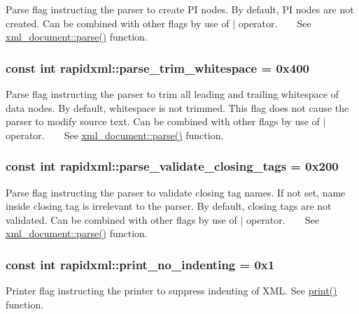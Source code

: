 Parse flag instructing the parser to create P\+I nodes. By default, P\+I nodes are not created. Can be combined with other flags by use of $\vert$ operator. ~\newline
~\newline
 See \hyperlink{singletonrapidxml_1_1xml__document_ac6e73ff9ac323bf5a370c38feb03a6b1}{xml\+\_\+document\+::parse()} function. \hypertarget{namespacerapidxml_a61912424b47db5038e726d4e1c22417f}{
\subsubsection[{parse\+\_\+trim\+\_\+whitespace}]{\setlength{\rightskip}{0pt plus 5cm}const int rapidxml\+::parse\+\_\+trim\+\_\+whitespace = 0x400}}\label{namespacerapidxml_a61912424b47db5038e726d4e1c22417f}
Parse flag instructing the parser to trim all leading and trailing whitespace of data nodes. By default, whitespace is not trimmed. This flag does not cause the parser to modify source text. Can be combined with other flags by use of $\vert$ operator. ~\newline
~\newline
 See \hyperlink{singletonrapidxml_1_1xml__document_ac6e73ff9ac323bf5a370c38feb03a6b1}{xml\+\_\+document\+::parse()} function. \hypertarget{namespacerapidxml_a7ce8f40fda68338e20b56f41e48e49f3}{
\subsubsection[{parse\+\_\+validate\+\_\+closing\+\_\+tags}]{\setlength{\rightskip}{0pt plus 5cm}const int rapidxml\+::parse\+\_\+validate\+\_\+closing\+\_\+tags = 0x200}}\label{namespacerapidxml_a7ce8f40fda68338e20b56f41e48e49f3}
Parse flag instructing the parser to validate closing tag names. If not set, name inside closing tag is irrelevant to the parser. By default, closing tags are not validated. Can be combined with other flags by use of $\vert$ operator. ~\newline
~\newline
 See \hyperlink{singletonrapidxml_1_1xml__document_ac6e73ff9ac323bf5a370c38feb03a6b1}{xml\+\_\+document\+::parse()} function. \hypertarget{namespacerapidxml_a65477b812a80f5bda693ec57e57de064}{
\subsubsection[{print\+\_\+no\+\_\+indenting}]{\setlength{\rightskip}{0pt plus 5cm}const int rapidxml\+::print\+\_\+no\+\_\+indenting = 0x1}}\label{namespacerapidxml_a65477b812a80f5bda693ec57e57de064}


Printer flag instructing the printer to suppress indenting of X\+M\+L. See \hyperlink{namespacerapidxml_a0fb0be6eba49fb2e2646d5a72a0dc355}{print()} function. 

